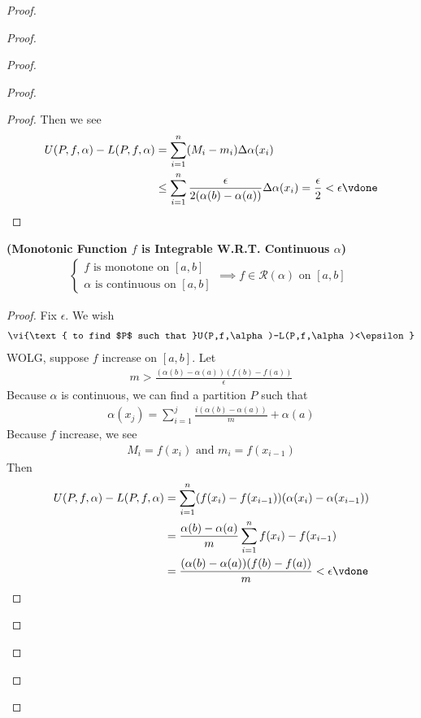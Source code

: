 \documentclass{report}
\begin{document}
\begin{proof}
\begin{proof}
\begin{proof}
\begin{proof}
\begin{proof}
Then we see  
\begin{align*}
U(P,f,\alpha )-L(P,f,\alpha )&=\sum_{i=1}^n (M_i-m_i) \Delta\alpha (x_i)\\
&\leq \sum_{i=1}^n  \frac{\epsilon}{2(\alpha (b)-\alpha (a))}\Delta \alpha (x_i)=\frac{\epsilon }{2}<\epsilon \vdone
\end{align*}
\end{proof}
\begin{theorem}
\label{7.1.16}
\textbf{(Monotonic Function $f$ is Integrable W.R.T. Continuous $\alpha$)} 
\begin{align*}
\begin{cases}
  f\text{ is monotone on $[a,b]$ }\\
  \alpha \text{ is continuous on }[a,b]
\end{cases}\implies f \in \mathscr{R}(\alpha )\text{ on $[a,b]$ }
\end{align*}
\end{theorem}
\begin{proof}
Fix $\epsilon $. We wish  
\begin{align*}
\vi{\text{ to find $P$ such that }U(P,f,\alpha )-L(P,f,\alpha )<\epsilon } 
\end{align*}
WOLG, suppose $f$ increase on $[a,b]$. Let 
\begin{align*}
m>\frac{(\alpha (b)-\alpha (a))(f(b)-f(a))}{\epsilon }
\end{align*}
Because $\alpha $ is continuous, we can find a partition $P$ such that 
 \begin{align*}
\alpha (x_j)=\sum_{i=1}^j \frac{i(\alpha (b)-\alpha (a))}{m} +\alpha (a)
\end{align*}
Because $f$ increase, we see 
\begin{align*}
M_i=f(x_i)\text{ and }m_i=f(x_{i-1})
\end{align*}
Then 
\begin{align*}
U(P,f,\alpha )-L(P,f,\alpha )&=\sum_{i=1}^n (f(x_i)-f(x_{i-1})) (\alpha (x_i)-\alpha (x_{i-1}))\\
&=\frac{\alpha (b)-\alpha (a)}{m}\sum_{i=1}^n f(x_i)-f(x_{i-1})\\
&=\frac{(\alpha (b)-\alpha (a))(f(b)-f(a))}{m}<\epsilon \vdone
\end{align*}




\end{proof}
\end{proof}
\end{proof}
\end{proof}
\end{proof}
\end{document}
